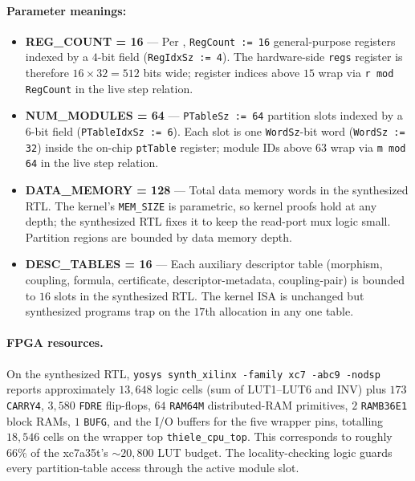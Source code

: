 \paragraph{Parameter meanings:}
\begin{itemize}
    \item \textbf{REG\_COUNT = 16} — Per , \texttt{RegCount := 16} general-purpose registers indexed by a $4$-bit field (\texttt{RegIdxSz := 4}). The hardware-side \texttt{regs} register is therefore $16 \times 32 = 512$ bits wide; register indices above $15$ wrap via \texttt{r mod RegCount} in the live step relation.

    \item \textbf{NUM\_MODULES = 64} — \texttt{PTableSz := 64} partition slots indexed by a $6$-bit field (\texttt{PTableIdxSz := 6}). Each slot is one \texttt{WordSz}-bit word (\texttt{WordSz := 32}) inside the on-chip \texttt{ptTable} register; module IDs above $63$ wrap via \texttt{m mod 64} in the live step relation.

    \item \textbf{DATA\_MEMORY = 128} — Total data memory words in the synthesized RTL. The kernel's \texttt{MEM\_SIZE} is parametric, so kernel proofs hold at any depth; the synthesized RTL fixes it to keep the read-port mux logic small. Partition regions are bounded by data memory depth.

    \item \textbf{DESC\_TABLES = 16} — Each auxiliary descriptor table (morphism, coupling, formula, certificate, descriptor-metadata, coupling-pair) is bounded to $16$ slots in the synthesized RTL. The kernel ISA is unchanged but synthesized programs trap on the $17$th allocation in any one table.
\end{itemize}

\paragraph{FPGA resources.}
On the synthesized RTL, \texttt{yosys synth\_xilinx -family xc7 -abc9 -nodsp} reports approximately $13{,}648$ logic cells (sum of LUT1--LUT6 and INV) plus $173$ \texttt{CARRY4}, $3{,}580$ \texttt{FDRE} flip-flops, $64$ \texttt{RAM64M} distributed-RAM primitives, $2$ \texttt{RAMB36E1} block RAMs, $1$ \texttt{BUFG}, and the I/O buffers for the five wrapper pins, totalling $18{,}546$ cells on the wrapper top \texttt{thiele\_cpu\_top}. This corresponds to roughly $66\%$ of the xc7a35t's $\sim 20{,}800$ LUT budget. The locality-checking logic guards every partition-table access through the active module slot.

